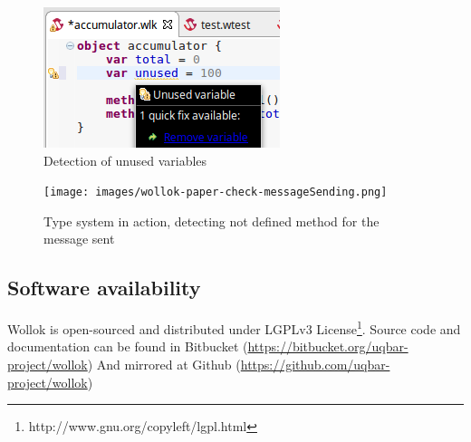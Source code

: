 \begin{figure}[ht]
    \centering
	\includegraphics[scale=0.5]{images/wollok-paper-check-unusedVariable.png}
    \caption{Detection of unused variables}
    \label{fig:check-unusedVariable.png}
\end{figure}

\begin{figure}[ht]
    \centering
	\texttt{[image: images/wollok-paper-check-messageSending.png]}
    \caption{Type system in action, detecting not defined method for the message sent}
    \label{fig:check-messageSending.png}
\end{figure}

\subsection{Software availability}
Wollok is open-sourced and distributed under LGPLv3 License\footnote{http://www.gnu.org/copyleft/lgpl.html}.
Source code and documentation can be found in Bitbucket (\url{https://bitbucket.org/uqbar-project/wollok}) 
And mirrored at Github (\url{https://github.com/uqbar-project/wollok})